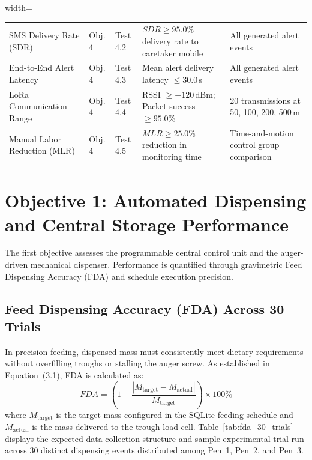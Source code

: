 \begin{table}[htbp!]
\begin{adjustbox}{width=\textwidth}
\begin{tabular}{lllll}
SMS Delivery Rate (SDR) & Obj. 4 & Test 4.2 & $SDR \ge 95.0\%$ delivery rate to caretaker mobile & All generated alert events \\
End-to-End Alert Latency & Obj. 4 & Test 4.3 & Mean alert delivery latency $\le 30.0$\,s & All generated alert events \\
LoRa Communication Range & Obj. 4 & Test 4.4 & RSSI $\ge -120$\,dBm; Packet success $\ge 95.0\%$ & 20 transmissions at 50, 100, 200, 500\,m \\
Manual Labor Reduction (MLR) & Obj. 4 & Test 4.5 & $MLR \ge 25.0\%$ reduction in monitoring time & Time-and-motion control group comparison \\
\bottomrule
\end{tabular}
\end{adjustbox}
\end{table}

\section{Objective 1: Automated Dispensing and Central Storage Performance}
\label{sec:results_obj1}

The first objective assesses the programmable central control unit and the auger-driven mechanical dispenser. Performance is quantified through gravimetric Feed Dispensing Accuracy (FDA) and schedule execution precision.

\subsection{Feed Dispensing Accuracy (FDA) Across 30 Trials}
In precision feeding, dispensed mass must consistently meet dietary requirements without overfilling troughs or stalling the auger screw. As established in Equation~(3.1), FDA is calculated as:
\begin{equation}
FDA = \left(1 - \frac{|M_{\text{target}} - M_{\text{actual}}|}{M_{\text{target}}}\right) \times 100\%
\end{equation}
where $M_{\text{target}}$ is the target mass configured in the SQLite feeding schedule and $M_{\text{actual}}$ is the mass delivered to the trough load cell. Table~\ref{tab:fda_30_trials} displays the expected data collection structure and sample experimental trial run across 30 distinct dispensing events distributed among Pen~1, Pen~2, and Pen~3.


